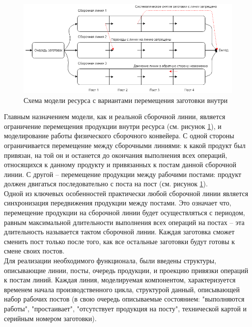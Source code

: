 \begin{figure}[ht]	
	\centering	
	\includegraphics[width=\linewidth]{pics/assemblyMain.png}
	\caption{Схема модели ресурса с вариантами перемещения заготовки внутри}
	\label{fig:assemblyMain}
\end{figure}

\indent Главным назначением модели, как и реальной сборочной линии, является ограничение перемещения продукции внутри ресурса (см. рисунок \ref{fig:assemblyMain}), и моделирование работы физического сборочного конвейера.
С одной стороны ограничивается перемещение между сборочными линиями: к какой продукт был привязан, на той он и останется до окончания выполнения всех операций, относящихся к данному продукту и привязанных к постам данной сборочной линии.
С другой -- перемещение продукции между рабочими постами: продукт должен двигаться последовательно с поста на пост (см. рисунок \ref{fig:assemblyMain}).\\
\indent Одной из ключевых особенностей практически любой сборочной линии является синхронизация передвижения продукции между постами.
Это означает что, перемещение продукции на сборочной линии будет осуществляться с периодом, равным максимальной длительности выполнения всех операций на постах -- эта длительность называется тактом сборочной линии.
Каждая заготовка сможет сменить пост только после того, как все остальные заготовки будут готовы к смене своих постов.\\
\indent Для реализации необходимого функционала, были введены структуры, описывающие линии, посты, очередь продукции, и проекцию привязки операций к постам линий.
Каждая линия, моделируемая компонентом, характеризуется временем начала производственного цикла, структурой данный, описывающей набор рабочих постов (в свою очередь описываемые состоянием: "выполняются работы", "простаивает", "отсутствует продукция на посту", технической картой и серийным номером заготовки).

